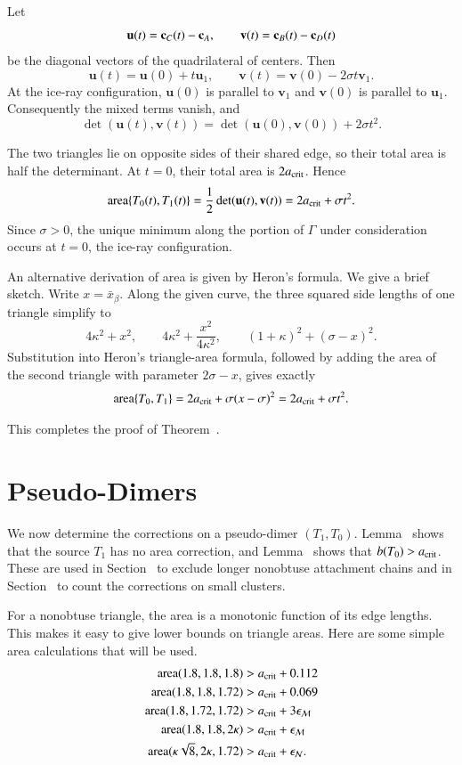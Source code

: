 Let
\[
\mathbf u(t)={\mathbf c}_C(t)-{\mathbf c}_A,\qquad
\mathbf v(t)={\mathbf c}_B(t)-{\mathbf c}_D(t)
\]
be the diagonal vectors of the quadrilateral of centers. Then
\[
\mathbf u(t)=\mathbf u(0)+t\mathbf u_1,\qquad
\mathbf v(t)=\mathbf v(0)-2\sigma t\mathbf v_1.
\]
At the ice-ray configuration, $\mathbf u(0)$ is parallel to
$\mathbf v_1$ and $\mathbf v(0)$ is parallel to $\mathbf u_1$.
Consequently the mixed terms vanish, and
\[
\det(\mathbf u(t),\mathbf v(t))
=
\det(\mathbf u(0),\mathbf v(0))+2\sigma t^2.
\]

The two triangles lie on opposite sides of their shared edge,
so their total area is half the determinant. At
$t=0$, their total area is $2a_\text{crit}$. Hence
\[
{\operatorname{area}}\{T_0(t),T_1(t)\}
=
\frac12\det(\mathbf u(t),\mathbf v(t))
=
2a_\text{crit}+\sigma t^2.
\]
Since $\sigma>0$, the unique minimum along the portion of
$\Gamma$ under consideration occurs at $t=0$, the ice-ray
configuration.

An alternative derivation of area is given by Heron's formula. We give a brief sketch.
Write \(x=\bar x_\beta\). Along the given curve, the three squared side lengths of one triangle simplify to
\[
4\kappa^2+x^2,\qquad
4\kappa^2+\frac{x^2}{4\kappa^2},\qquad
(1+\kappa)^2+(\sigma-x)^2.
\]
Substitution into Heron's triangle-area formula,
followed by adding the area of the second triangle with parameter \(2\sigma-x\), gives exactly
\[
{\operatorname{area}}\{T_0,T_1\}
      =2a_{\rm crit}+\sigma(x-\sigma)^2
      =2a_{\rm crit}+\sigma t^2.
\]

This completes the proof of Theorem~.

\section{Pseudo-Dimers}

We now determine the corrections on a pseudo-dimer $(T_1,T_0)$.
Lemma~ shows that the source $T_1$ has no area correction,
and Lemma~ shows that $b(T_0)>a_\text{crit}$.  These are
used in Section~ to exclude longer nonobtuse
attachment chains and in Section~ to count the
corrections on small clusters.

For a nonobtuse triangle, the area is a monotonic function of its edge
lengths.  This makes it easy to give lower bounds on triangle areas.
Here are some simple area calculations that will be used.
\begin{align*}
{\operatorname{area}}(1.8,1.8,1.8) &> a_\text{crit} + 0.112\\
{\operatorname{area}}(1.8,1.8,1.72) &> a_\text{crit} + 0.069\\
{\operatorname{area}}(1.8,1.72,1.72) &> a_\text{crit} + 3\epsilon_{\mathcal M}\\
{\operatorname{area}}(1.8,1.8,2\kappa) &> a_\text{crit} + \epsilon_{\mathcal M}\\
{\operatorname{area}}(\kappa\sqrt8,2\kappa,1.72) &> a_\text{crit} +\epsilon_{\mathcal N}.
\end{align*}

